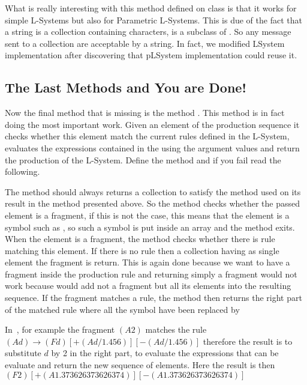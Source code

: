 What is really interesting with this method  defined
on class  is that it works for simple L-Systems but also
for Parametric L-Systems. This is due of the fact that a string is a
collection containing characters,  is a subclass of
.  So any message sent to a collection are acceptable
by a string. In fact, we modified LSystem implementation after
discovering that pLSystem implementation could reuse it.

\subsection{The Last Methods and You are Done!}
Now the final method that is missing is the method
. This method is in fact doing the most important
work. Given an element of the production sequence it checks whether
this element match the current rules defined in the L-System,
evaluates the expressions contained in the using the argument values
and return the production of the L-System. Define the method 
and if you fail read the following. 

The method  should always returns a collection to satisfy the
 method used on its result in the method
 presented above.
So the method  checks whether the passed element is
a fragment, if this is not the case, this means that the element is a
symbol such as \ct{[}, \ct{+} so such a symbol is put inside an array
and the method exits.  When the element is a fragment, the method
checks whether there is rule matching this element. If there is no
rule then a collection having as single element the fragment is
return. This is again done because we want to have a fragment inside
the production rule and returning simply a fragment would not work
because  would add not a fragment but all its elements
into the resulting sequence. If the fragment matches a rule, the
method then returns the right part of the matched rule where all the
symbol have been replaced by

In~, for example the fragment $(A 2)$ matches
the rule $(A d) \rightarrow (F d)[+(A d / 1.456)][-(A d / 1.456)]$
therefore the result is to substitute $d$ by 2 in the right part, to
evaluate the expressions that can be evaluate and return the new
sequence of elements. Here the result is then $(F 2) [+(A 1.373626373626374)][-(A 1.373626373626374)]$


